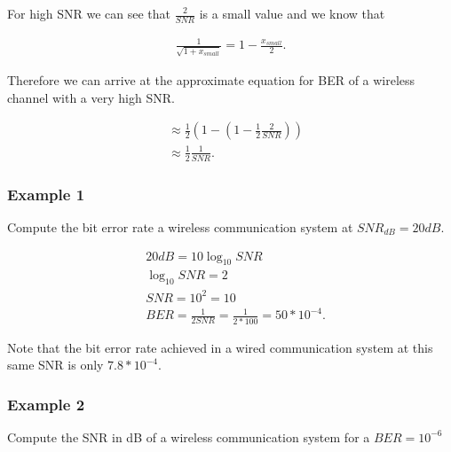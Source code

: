               For high SNR we can see that $\frac{2}{SNR}$ is a
               small value and we know that

               \begin{center}
               \begin{align}
                  \frac{1}{\sqrt{1+x_{small}}} = 1-\frac{x_{small}}{2}.
               \end{align}
               \end{center}

               Therefore we can arrive at the approximate equation for BER of a
               wireless channel with a very high SNR.

               \begin{center}
               \begin{align}
                     &\approx \frac{1}{2} \left(1- \left(1-
                     \frac{1}{2}\frac{2}{SNR} \right) \right) \\[10pt]
                     &\approx \frac{1}{2} \frac{1}{SNR}.
               \end{align}
               \end{center}

               \subsubsection{Example 1}
               Compute the bit error rate a wireless communication system at
               $SNR_{dB}=20dB$.

               \begin{center}
               \begin{align}
                  &20dB=10\log_{10}SNR \\[10pt]
                  &\log_{10}SNR=2 \\[10pt]
                  &SNR=10^{2}=10 \\[10pt]
                  &BER=\frac{1}{2SNR} = \frac{1}{2*100} = 50*10^{-4}.
               \end{align}
               \end{center}

               Note that the bit error rate achieved in a wired communication
               system at this same SNR is only $7.8*10^{-4}$.

               \subsubsection{Example 2}
               Compute the SNR in dB of a wireless communication system for a
               $BER=10^{-6}$ 

